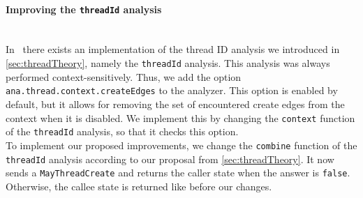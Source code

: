     \paragraph{Improving the \texttt{threadId} analysis}\mbox{}\\
    In \gob\ there exists an implementation of the thread ID analysis we introduced in \autoref{sec:threadTheory}, namely the \texttt{threadId} analysis. This analysis was always performed context-sensitively. Thus, we add the option \texttt{ana.thread.context.createEdges} to the analyzer. This option is enabled by default, but it allows for removing the set of encountered create edges from the context when it is disabled. We implement this by changing the \texttt{context} function of the \texttt{threadId} analysis, so that it checks this option.\\
    To implement our proposed improvements, we change the \texttt{combine} function of the \texttt{threadId} analysis according to our proposal from \autoref{sec:threadTheory}. It now sends a \texttt{MayThreadCreate} and returns the caller state when the answer is \texttt{false}. Otherwise, the callee state is returned like before our changes.

